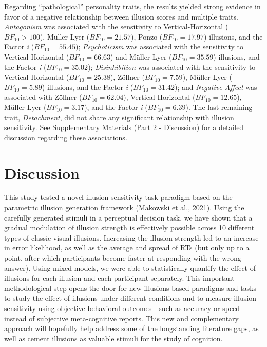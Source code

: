 \documentclass[
  man,floatsintext]{apa6}
\begin{document}
Regarding ``pathological'' personality traits, the results yielded strong evidence in favor of a negative relationship between illusion scores and multiple traits. \emph{Antagonism} was associated with the sensitivity to Vertical-Horizontal (\(BF_{10} > 100\)), Müller-Lyer (\(BF_{10} = 21.57\)), Ponzo (\(BF_{10} = 17.97\)) illusions, and the Factor \emph{i} (\(BF_{10} = 55.45\)); \emph{Psychoticism} was associated with the sensitivity to Vertical-Horizontal (\(BF_{10} = 66.63\)) and Müller-Lyer (\(BF_{10} = 35.59\)) illusions, and the Factor \emph{i} (\(BF_{10} = 35.02\)); \emph{Disinhibition} was associated with the sensitivity to Vertical-Horizontal (\(BF_{10} = 25.38\)), Zöllner (\(BF_{10} = 7.59\)), Müller-Lyer (\(BF_{10} = 5.89\)) illusions, and the Factor \emph{i} (\(BF_{10} = 31.42\)); and \emph{Negative Affect} was associated with Zöllner (\(BF_{10} = 62.04\)), Vertical-Horizontal (\(BF_{10} = 12.65\)), Müller-Lyer (\(BF_{10} = 3.17\)), and the Factor \emph{i} (\(BF_{10} = 6.39\)). The last remaining trait, \emph{Detachment}, did not share any significant relationship with illusion sensitivity. See Supplementary Materials (Part 2 - Discussion) for a detailed discussion regarding these associations.

\hypertarget{discussion}{%
\section{Discussion}\label{discussion}}

This study tested a novel illusion sensitivity task paradigm based on the parametric illusion generation framework (Makowski et al., 2021). Using the carefully generated stimuli in a perceptual decision task, we have shown that a gradual modulation of illusion strength is effectively possible across 10 different types of classic visual illusions. Increasing the illusion strength led to an increase in error likelihood, as well as the average and spread of RTs (but only up to a point, after which participants become faster at responding with the wrong answer). Using mixed models, we were able to statistically quantify the effect of illusions for each illusion and each participant separately. This important methodological step opens the door for new illusions-based paradigms and tasks to study the effect of illusions under different conditions and to measure illusion sensitivity using objective behavioral outcomes - such as accuracy or speed - instead of subjective meta-cognitive reports. This new and complementary approach will hopefully help address some of the longstanding literature gaps, as well as cement illusions as valuable stimuli for the study of cognition.
\end{document}
